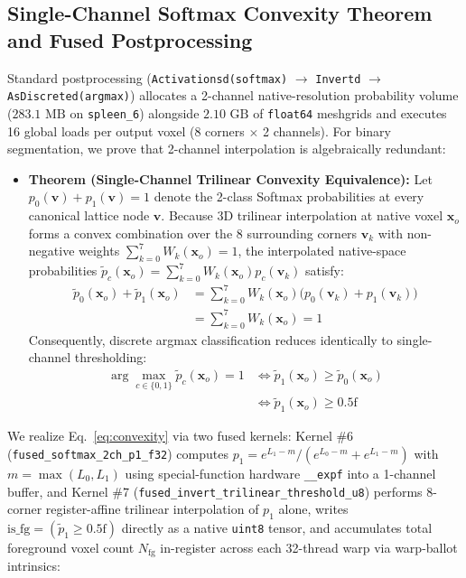 \documentclass[10pt,twocolumn]{article}
\begin{document}
\subsection{Single-Channel Softmax Convexity Theorem and Fused Postprocessing}
Standard postprocessing (\texttt{Activationsd(softmax)} $\to$ \texttt{Invertd} $\to$ \texttt{AsDiscreted(argmax)}) allocates a 2-channel native-resolution probability volume ($283.1\text{ MB}$ on \texttt{spleen\_6}) alongside $2.10\text{ GB}$ of \texttt{float64} meshgrids and executes 16 global loads per output voxel (8 corners $\times$ 2 channels). For binary segmentation, we prove that 2-channel interpolation is algebraically redundant:
\begin{itemize}
    \item \textbf{Theorem (Single-Channel Trilinear Convexity Equivalence):} Let $p_0(\mathbf{v}) + p_1(\mathbf{v}) = 1$ denote the 2-class Softmax probabilities at every canonical lattice node $\mathbf{v}$. Because 3D trilinear interpolation at native voxel $\mathbf{x}_o$ forms a convex combination over the 8 surrounding corners $\mathbf{v}_k$ with non-negative weights $\sum_{k=0}^7 W_k(\mathbf{x}_o) = 1$, the interpolated native-space probabilities $\tilde{p}_c(\mathbf{x}_o) = \sum_{k=0}^7 W_k(\mathbf{x}_o) p_c(\mathbf{v}_k)$ satisfy:
    \begin{equation}
    \begin{aligned}
        \tilde{p}_0(\mathbf{x}_o) + \tilde{p}_1(\mathbf{x}_o) &= \sum_{k=0}^7 W_k(\mathbf{x}_o)\big(p_0(\mathbf{v}_k) + p_1(\mathbf{v}_k)\big) \\
        &= \sum_{k=0}^7 W_k(\mathbf{x}_o) = 1
    \end{aligned}
    \end{equation}
    Consequently, discrete argmax classification reduces identically to single-channel thresholding:
    \begin{equation}
    \begin{aligned}
        \arg\max_{c \in \{0, 1\}} \tilde{p}_c(\mathbf{x}_o) = 1 &\iff \tilde{p}_1(\mathbf{x}_o) \ge \tilde{p}_0(\mathbf{x}_o) \\
        &\iff \tilde{p}_1(\mathbf{x}_o) \ge 0.5\text{f}
    \end{aligned}
    \label{eq:convexity}
    \end{equation}
\end{itemize}
We realize Eq.~\eqref{eq:convexity} via two fused kernels: Kernel \#6 (\texttt{fused\_softmax\_2ch\_p1\_f32}) computes $p_1 = e^{L_1 - m}/(e^{L_0 - m} + e^{L_1 - m})$ with $m = \max(L_0, L_1)$ using special-function hardware \texttt{\_\_expf} into a 1-channel buffer, and Kernel \#7 (\texttt{fused\_invert\_trilinear\_threshold\_u8}) performs 8-corner register-affine trilinear interpolation of $p_1$ alone, writes $\text{is\_fg} = (\tilde{p}_1 \ge 0.5\text{f})$ directly as a native \texttt{uint8} tensor, and accumulates total foreground voxel count $N_{\text{fg}}$ in-register across each 32-thread warp via warp-ballot intrinsics:
\end{document}
